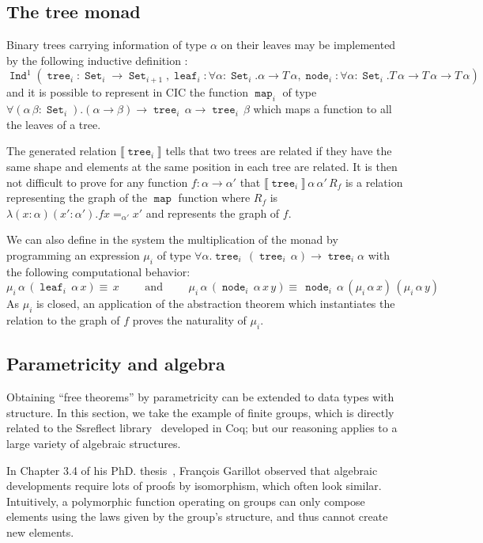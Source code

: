\documentclass[a4paper,USenglish]{lipics}
\DeclareMathOperator{\Set}{\mathtt{Set}}
\DeclareMathOperator{\Ind}{\mathtt{Ind}}
\DeclareMathOperator{\Map}{\mathtt{map}}
\DeclareMathOperator{\Tree}{\mathtt{tree}}
\DeclareMathOperator{\Node}{\mathtt{node}}
\DeclareMathOperator{\Leaf}{\mathtt{leaf}}
\def\coq{\textsf{Coq}\xspace}
\def\cic{\textsf{CIC}\xspace}
\def\ssreflect{\textsf{Ssreflect}\xspace}
\begin{document}
\subsection{The tree monad}\label{sec:examples:tree}

Binary trees carrying information of type $α$ on their leaves may be
implemented by the following inductive definition :
$$\Ind^1(\Tree_i : \Set_i → \Set_{i+1},
       \Leaf_i : ∀α:\Set_i. α → T\,α,
       \Node_i : ∀α:\Set_i. T\,α → T\,α → T\,α)$$
and it is possible to represent in \cic the function $\Map_i$ of type
$∀(α\,β:\Set_i). (α → β) → \Tree_i\,α → \Tree_i\,β$ which maps a
function to all the leaves of a tree.

The generated relation $⟦\Tree_i⟧$
tells that two trees are related if they have the same shape and
elements at the same position in each tree are related. It is then not
difficult to prove for any function $f : α → α'$ that $⟦\Tree_i⟧\,α\,α'\,R_f$
is a relation representing the graph of the $\Map$ function where
$R_f$ is $λ(x:α)(x':α').f x =_{α'} x'$ and represents the graph of $f$.

We can also define in the system the multiplication of the monad by
programming an expression $\mu_i$ of type $∀α.\Tree_i\,(\Tree_i\,α) →  \Tree_i α$ with the following computational behavior:
 $$ \mu_i\,α\,(\Leaf_i\,α\,x) ≡  \,x \hspace{2em}\text{ and }\hspace{2em}
  \mu_i\,α\,(\Node_i\,α\,x\,y) ≡  \,\Node_i\,α\,(\mu_i\,α\,x)\,(\mu_i\,α\,y)$$
As $\mu_i$ is closed, an application of the abstraction theorem which
instantiates the relation to the graph of $f$ proves the naturality of
$\mu_i$.


\subsection{Parametricity and algebra}\label{sec:examples:algebra}

Obtaining ``free theorems'' by parametricity can be extended to data
types with structure. In this section, we take the example of finite
groups, which is directly related to the \ssreflect
library~\cite{DBLP:conf/tphol/GonthierMRTT07} developed in \coq; but our
reasoning applies to a large variety of algebraic structures.

In Chapter 3.4 of his PhD. thesis~\cite{Garillot11}, François Garillot
observed that algebraic developments require lots of proofs by
isomorphism, which often look similar. Intuitively, a polymorphic function
operating on groups can only compose elements using the laws given by
the group's structure, and thus cannot create new elements.
\end{document}
